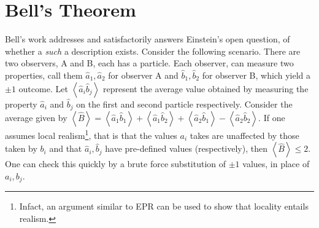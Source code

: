 \section{Bell's Theorem\label{sec:Bell's-Theorem}}

Bell's work addresses and satisfactorily answers Einstein's open question,
of whether a \emph{such} a description exists. Consider the following
scenario. There are two observers, A and B, each has a particle. Each
observer, can measure two properties, call them $\hat{a}_{1},\hat{a}_{2}$
for observer A and $\hat{b}_{1},\hat{b}_{2}$ for observer B, which
yield a $\pm1$ outcome. Let $\left\langle \hat{a}_{i}\hat{b}_{j}\right\rangle $
represent the average value obtained by measuring the property $\hat{a}_{i}$
and $\hat{b}_{j}$ on the first and second particle respectively.
Consider the average given by $\left\langle \hat{B}\right\rangle =\left\langle \hat{a}_{1}\hat{b}_{1}\right\rangle +\left\langle \hat{a}_{1}\hat{b}_{2}\right\rangle +\left\langle \hat{a}_{2}\hat{b}_{1}\right\rangle -\left\langle \hat{a}_{2}\hat{b}_{2}\right\rangle $.
If one assumes local realism\footnote{Infact, an argument similar to EPR can be used to show that locality
entails realism.}, that is that the values $a_{i}$ takes are unaffected by those taken
by $b_{i}$ and that $\hat{a}_{i},\hat{b}_{j}$ have pre-defined values
(respectively), then $\left\langle \hat{B}\right\rangle \le2$. One
can check this quickly by a brute force substitution of $\pm1$ values,
in place of $a_{i},b_{j}$.

